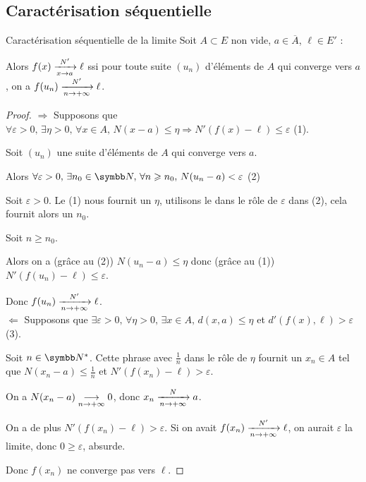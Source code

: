 \subsection{Caractérisation séquentielle}

\begin{theoreme}{Caractérisation séquentielle de la limite}{}
    Soit $A \subset E$ non vide, $a \in \overline A$, $\ell \in E'$ :

    Alors $f(x) \limitnorme{N'}{x}{a} \ell$ ssi pour toute suite $(u_n)$ 
    d'éléments de $A$ qui converge vers $a$, on a $f(u_n) \limitnorme{N'}{n}{+ \infty} \ell$.
\end{theoreme}


\begin{proof}
    $\Rightarrow$ Supposons que $\forall \varepsilon > 0, \, \exists \eta > 0, \, \forall x \in A, \, N(x - a) \leqslant \eta \Rightarrow N'(f(x) - \ell) \leqslant \varepsilon$ (1).

    Soit $(u_n)$ une suite d'éléments de $A$ qui converge vers $a$.

    Alors $\forall \varepsilon > 0, \, \exists n_0 \in \N, \, \forall n \geqslant n_0, \, N(u_n - a) < \varepsilon$ (2)

    Soit $\varepsilon > 0$. Le (1) nous fournit un $\eta$, utilisons le dans le rôle de $\varepsilon$ dans (2),
    cela fournit alors un $n_0$.

    Soit $n \geqslant n_0$. 

    Alors on a (grâce au (2)) $N(u_n - a) \leqslant \eta$ donc (grâce au (1)) $N'(f(u_n) - \ell) \leqslant \varepsilon$.

    Donc $f(u_n) \limitnorme{N'}{n}{+ \infty} \ell$. \\

    $\Leftarrow$ Supposons que $\exists \varepsilon > 0, \, \forall \eta > 0, \, \exists x \in A, \, d(x, a) \leqslant \eta $ et $d'(f(x), \ell) > \varepsilon$ (3).

    Soit $n \in \N^*$. Cette phrase avec $\frac 1 n$ dans le rôle de $\eta$ fournit
    un $x_n \in A$ tel que $N(x_n - a) \leqslant \frac 1 n$ et $N'(f(x_n) - \ell) > \varepsilon$.

    On a $N(x_n - a) \limit n {+ \infty} 0$, donc $x_n \limitnorme N n {+ \infty} a$.

    On a de plus $N'(f(x_n) - \ell) > \varepsilon$. Si on avait $f(x_n) \limitnorme{N'}{n}{+ \infty} \ell$, 
    on aurait $\varepsilon$ la limite, donc $0 \geqslant \varepsilon$, absurde.

    Donc $f(x_n)$ ne converge pas vers $\ell$.
\end{proof}

